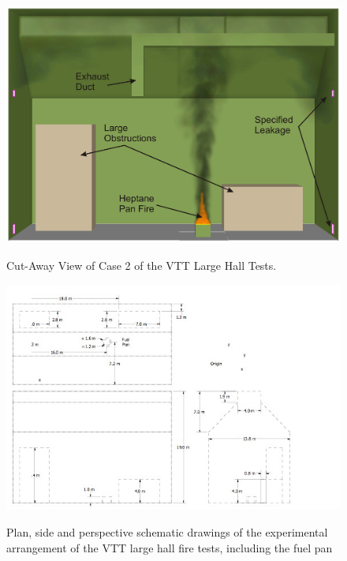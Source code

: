 \begin{figure}[\figoptions{b}]
\begin{center}
\includegraphics[width=5.0in]{FIGURES/VTT/VTT_Cut_Away}\\
\end{center}
\caption{Cut-Away View of Case 2 of the VTT Large Hall Tests.}
 \label{fig:VTT_cutaway}
\end{figure}

\begin{figure}[\figoptions{b}]
\begin{center}
\includegraphics[width=8.0in, angle=90]{FIGURES/VTT/VTT_Schematic}\\
\end{center}
\caption{Plan, side and perspective schematic drawings of the experimental arrangement of the VTT large hall fire tests, including the fuel pan}
 \label{fig:VTT_Schematic}
\end{figure}

